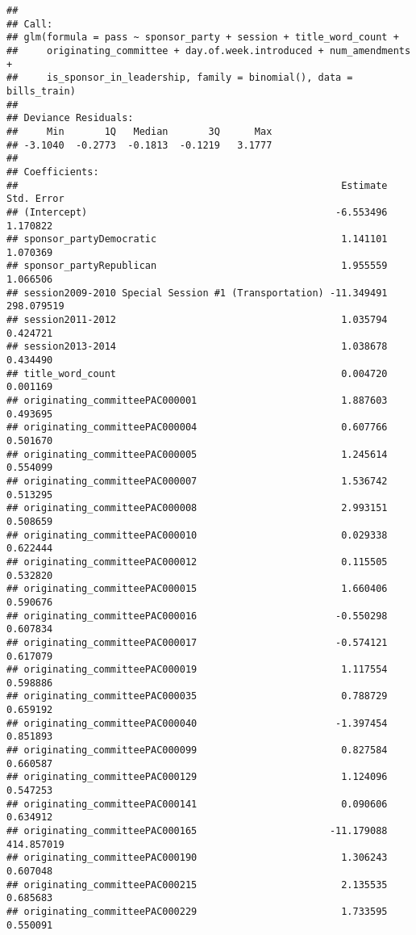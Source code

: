 \documentclass[]{article}
\begin{document}
\begin{verbatim}
## 
## Call:
## glm(formula = pass ~ sponsor_party + session + title_word_count + 
##     originating_committee + day.of.week.introduced + num_amendments + 
##     is_sponsor_in_leadership, family = binomial(), data = bills_train)
## 
## Deviance Residuals: 
##     Min       1Q   Median       3Q      Max  
## -3.1040  -0.2773  -0.1813  -0.1219   3.1777  
## 
## Coefficients:
##                                                        Estimate Std. Error
## (Intercept)                                           -6.553496   1.170822
## sponsor_partyDemocratic                                1.141101   1.070369
## sponsor_partyRepublican                                1.955559   1.066506
## session2009-2010 Special Session #1 (Transportation) -11.349491 298.079519
## session2011-2012                                       1.035794   0.424721
## session2013-2014                                       1.038678   0.434490
## title_word_count                                       0.004720   0.001169
## originating_committeePAC000001                         1.887603   0.493695
## originating_committeePAC000004                         0.607766   0.501670
## originating_committeePAC000005                         1.245614   0.554099
## originating_committeePAC000007                         1.536742   0.513295
## originating_committeePAC000008                         2.993151   0.508659
## originating_committeePAC000010                         0.029338   0.622444
## originating_committeePAC000012                         0.115505   0.532820
## originating_committeePAC000015                         1.660406   0.590676
## originating_committeePAC000016                        -0.550298   0.607834
## originating_committeePAC000017                        -0.574121   0.617079
## originating_committeePAC000019                         1.117554   0.598886
## originating_committeePAC000035                         0.788729   0.659192
## originating_committeePAC000040                        -1.397454   0.851893
## originating_committeePAC000099                         0.827584   0.660587
## originating_committeePAC000129                         1.124096   0.547253
## originating_committeePAC000141                         0.090606   0.634912
## originating_committeePAC000165                       -11.179088 414.857019
## originating_committeePAC000190                         1.306243   0.607048
## originating_committeePAC000215                         2.135535   0.685683
## originating_committeePAC000229                         1.733595   0.550091

\end{verbatim}
\end{document}
